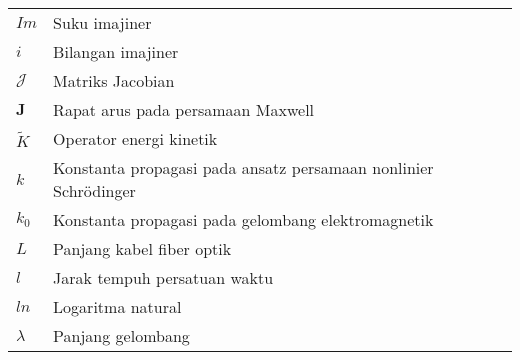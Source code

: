 \begin{center}
\begin{tabular}{lp{}}
  $Im$ & Suku imajiner \\
  $i$ & Bilangan imajiner \\
  $\mathcal{J}$ & Matriks Jacobian \\
  $\mathbf{J}$ & Rapat arus pada persamaan Maxwell \\
  $\tilde{K}$ & Operator energi kinetik \\
  $k$ & Konstanta propagasi pada ansatz persamaan nonlinier Schr\"odinger \\
  $k_0$ & Konstanta propagasi pada gelombang elektromagnetik \\
  $L$ & Panjang kabel fiber optik\\
  $l$ & Jarak tempuh persatuan waktu\\
    $ln$ & Logaritma natural \\
  $\lambda$ & Panjang gelombang\\

\end{tabular}
\end{center}

